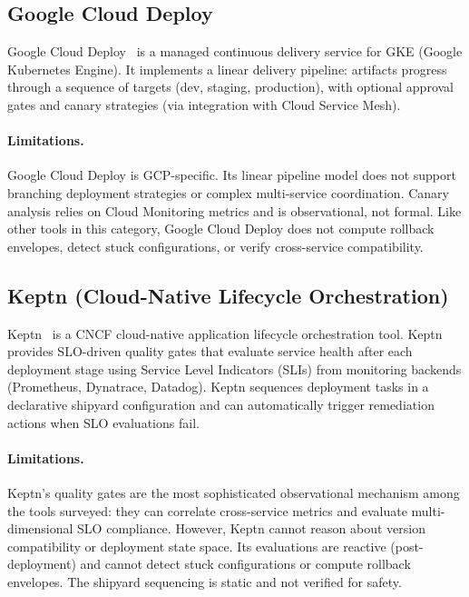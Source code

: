 \documentclass[10pt,twocolumn]{article}
\begin{document}
\subsection{Google Cloud Deploy}

Google Cloud Deploy~\cite{gcloud-deploy} is a managed continuous
delivery service for GKE (Google Kubernetes Engine). It implements
a linear delivery pipeline: artifacts progress through a sequence
of targets (dev, staging, production), with optional approval
gates and canary strategies (via integration with Cloud Service
Mesh).

\paragraph{Limitations.}
Google Cloud Deploy is GCP-specific. Its linear pipeline model
does not support branching deployment strategies or complex
multi-service coordination. Canary analysis relies on Cloud
Monitoring metrics and is observational, not formal. Like other
tools in this category, Google Cloud Deploy does not compute
rollback envelopes, detect stuck configurations, or verify
cross-service compatibility.

\subsection{Keptn (Cloud-Native Lifecycle Orchestration)}

Keptn~\cite{keptn} is a CNCF cloud-native application
lifecycle orchestration tool. Keptn provides SLO-driven
quality gates that evaluate service health after each
deployment stage using Service Level Indicators (SLIs)
from monitoring backends (Prometheus, Dynatrace, Datadog).
Keptn sequences deployment tasks in a declarative shipyard
configuration and can automatically trigger remediation
actions when SLO evaluations fail.

\paragraph{Limitations.}
Keptn's quality gates are the most sophisticated observational
mechanism among the tools surveyed: they can correlate
cross-service metrics and evaluate multi-dimensional SLO
compliance. However, Keptn cannot reason about version
compatibility or deployment state space. Its evaluations
are reactive (post-deployment) and cannot detect stuck
configurations or compute rollback envelopes. The shipyard
sequencing is static and not verified for safety.
\end{document}
